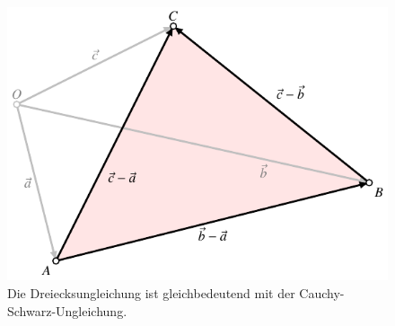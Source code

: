 %
%
%
\begin{figure}
\centering
\includegraphics{chapters/010-skalarprodukt/images/dreieck.pdf}
\caption{Die Dreiecksungleichung ist gleichbedeutend mit der
Cauchy-Schwarz-Ungleichung.
\label{buch:skalarprodukt:ungleichungen:fig:dreieck}}
\end{figure}
